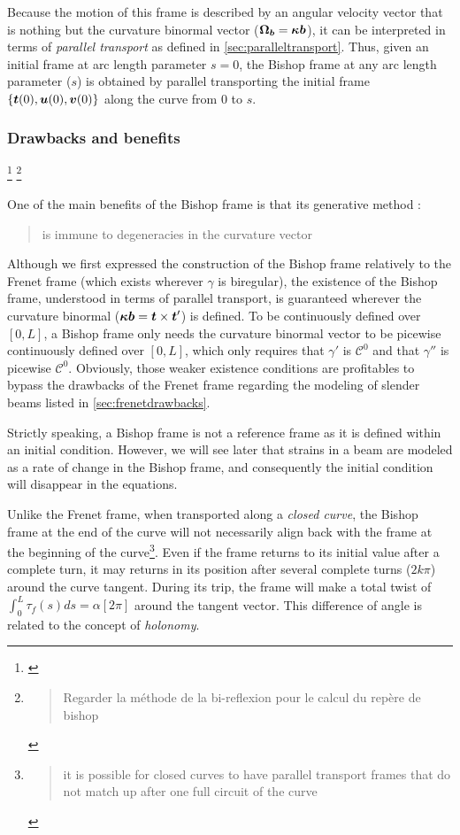 Because the motion of this frame is described by an angular velocity vector that is nothing but the curvature binormal vector ($\boldsymbol{\Omega_b} = \boldsymbol{\kappa b}$), it can be interpreted in terms of \emph{parallel transport} as defined in \cref{sec:paralleltransport}. Thus, given an initial frame at arc length parameter $s=0$, the Bishop frame at any arc length parameter ($s$) is obtained by parallel transporting the initial frame $\{\boldsymbol{t}(0),\boldsymbol{u}(0), \boldsymbol{v}(0)\}$ along the curve from $0$ to $s$.

\subsubsection{Drawbacks and benefits}
\footnote{\cite{Guggenheimer1989, Klok1986, Bloomenthal1990, Wang2008, Poston1995, Menninger2013}}
\footnote{\blockcquote[p.6]{Wang2008}{Regarder la méthode de la bi-reflexion pour le calcul du repère de bishop}}

One of the main benefits of the Bishop frame is that its generative method : \blockcquote{Bloomenthal1990}{is immune to degeneracies in the curvature vector}. Although we first expressed the construction of the Bishop frame relatively to the Frenet frame (which exists wherever $\gamma$ is biregular), the existence of the Bishop frame, understood in terms of parallel transport, is guaranteed wherever the curvature binormal ($\boldsymbol{\kappa b} = \boldsymbol{t} \times \boldsymbol{t}'$) is defined. To be continuously defined over $[0,L]$, a Bishop frame only needs the curvature binormal vector to be picewise continuously defined over  $[0,L]$, which only requires that $\gamma'$ is $\mathcal{C}^0$ and that $\gamma''$ is picewise $\mathcal{C}^0$. Obviously, those weaker existence conditions are profitables to bypass the drawbacks of the Frenet frame regarding the modeling of slender beams listed in \cref{sec:frenetdrawbacks}.

Strictly speaking, a Bishop frame is not a reference frame as it is defined within an initial condition. However, we will see later that strains in a beam are modeled as a rate of change in the Bishop frame, and consequently the initial condition will disappear in the equations.

Unlike the Frenet frame, when transported along a \emph{closed curve}, the Bishop frame at the end of the curve will not necessarily align back with the frame at the beginning of the curve\footnote{\blockcquote{Hanson95}{it is possible for closed curves to have parallel transport frames that do not match up after one full circuit of the curve}}. Even if the frame returns to its initial value after a complete turn, it may returns in its position after several complete turns ($2k\pi$) around the curve tangent. During its trip, the frame will make a total twist of $\int_0^L \tau_f(s)ds = \alpha[2\pi]$ around the tangent vector. This difference of angle is related to the concept of  \emph{holonomy}.

